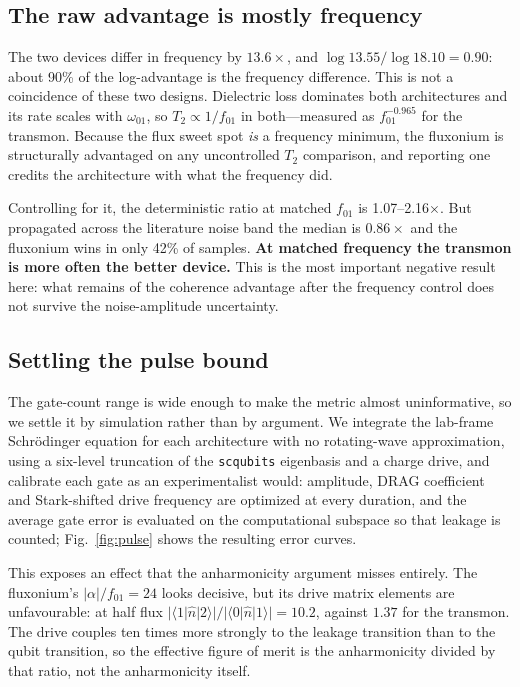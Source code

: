 \documentclass[journal]{IEEEtran}
\begin{document}
\subsection{The raw advantage is mostly frequency}

The two devices differ in frequency by $13.6\times$, and
$\log 13.55/\log 18.10 = 0.90$: about 90\% of the log-advantage is the frequency difference.
This is not a coincidence of these two designs. Dielectric loss dominates both architectures
and its rate scales with $\omega_{01}$, so $T_2 \propto 1/f_{01}$ in both---measured as
$f_{01}^{-0.965}$ for the transmon. Because the flux sweet spot \emph{is} a frequency
minimum, the fluxonium is structurally advantaged on any uncontrolled $T_2$ comparison, and
reporting one credits the architecture with what the frequency did.

Controlling for it, the deterministic ratio at matched $f_{01}$ is 1.07--2.16$\times$. But
propagated across the literature noise band the median is $0.86\times$ and the fluxonium wins
in only 42\% of samples. \textbf{At matched frequency the transmon is more often the better
device.} This is the most important negative result here: what remains of the coherence
advantage after the frequency control does not survive the noise-amplitude uncertainty.

\subsection{Settling the pulse bound}
\label{sec:pulse}

The gate-count range is wide enough to make the metric almost uninformative, so we settle it
by simulation rather than by argument. We integrate the lab-frame Schr\"odinger equation for
each architecture with no rotating-wave approximation, using a six-level truncation of the
\texttt{scqubits} eigenbasis and a charge drive, and calibrate each gate as an experimentalist
would: amplitude, DRAG coefficient~\cite{motzoi2009} and Stark-shifted drive frequency are
optimized at every duration, and the average gate error is evaluated on the computational
subspace so that leakage is counted; Fig.~\ref{fig:pulse} shows the resulting error curves.

This exposes an effect that the anharmonicity argument misses entirely. The fluxonium's
$|\alpha|/f_{01} = 24$ looks decisive, but its drive matrix elements are unfavourable: at
half flux $|\langle 1|\hat n|2\rangle| / |\langle 0|\hat n|1\rangle| = 10.2$, against $1.37$
for the transmon. The drive couples ten times more strongly to the leakage transition than to
the qubit transition, so the effective figure of merit is the anharmonicity divided by that
ratio, not the anharmonicity itself.
\end{document}

